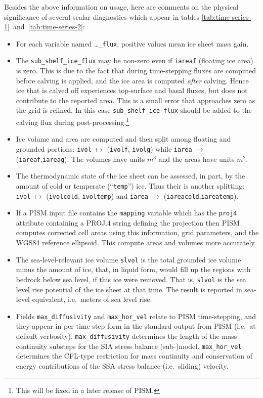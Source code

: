 Besides the above information on usage, here are comments on the physical significance of several scalar diagnostics which appear in tables \ref{tab:time-series-1}~and~\ref{tab:time-series-2}:
\begin{itemize}
  \item For each variable named \dots\texttt{_flux}, positive values mean ice sheet mass gain.
  \item The \texttt{sub_shelf_ice_flux} may be non-zero even if \texttt{iareaf} (floating ice area) is zero. This is due to the fact that during time-stepping fluxes are computed before calving is applied, and the ice area is computed \emph{after} calving. Hence ice that is calved off experiences top-surface and basal fluxes, but does not contribute to the reported area. This is a small error that approaches zero as the grid is refined. In this case \texttt{sub_shelf_ice_flux} should be added to the calving flux during post-processing.\footnote{This will be fixed in a later release of PISM.}
  \item Ice volume and area are computed and then split among floating and grounded portions: \texttt{ivol} $\mapsto$ (\texttt{ivolf}, \texttt{ivolg}) while \texttt{iarea} $\mapsto$ (\texttt{iareaf},\texttt{iareag}).  The volumes have units \textsl{$m^3$} and the areas have units \textsl{$m^2$}.
  \item The thermodynamic state of the ice sheet can be assessed, in part, by the amount of cold or temperate (``\texttt{temp}'') ice.  Thus their is another splitting: \texttt{ivol} $\mapsto$ (\texttt{ivolcold}, \texttt{ivoltemp}) and \texttt{iarea} $\mapsto$ (\texttt{iareacold},\texttt{iareatemp}).
  \item If a PISM input file contains the \texttt{mapping} variable which has the
\texttt{proj4} attribute containing a PROJ.4 string defining the projection then PISM computes corrected cell areas
using this information, grid parameters, and the WGS84 reference ellipsoid. This compute areas and volumes more accurately.
  \item The sea-level-relevant ice volume \texttt{slvol} is the total grounded ice volume minus the amount of ice, that, in liquid form, would fill up the regions with bedrock below sea level, if this ice were removed.  That is, \texttt{slvol} is the sea level rise potential of the ice sheet at that time.  The result is reported  in sea-level equivalent, i.e.~meters of sea level rise.
  \item Fields \texttt{max_diffusivity} and \texttt{max_hor_vel} relate to PISM time-stepping, and they appear in per-time-step form in the standard output from PISM (i.e.~at default verbosity).  \texttt{max_diffusivity} determines the length of the mass continuity substeps for the SIA stress balance (sub-)model.  \texttt{max_hor_vel} determines the CFL-type restriction for mass continuity and conservation of energy contributions of the SSA stress balance (i.e.~sliding) velocity.
\end{itemize}


